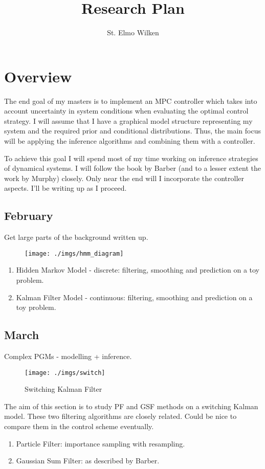 \documentclass[11pt,fleqn]{article}
\title{Research Plan}
\author{St. Elmo Wilken}
\begin{document}
\maketitle

\section{Overview}
The end goal of my masters is to implement an MPC controller which takes into account uncertainty in system conditions when evaluating the optimal control strategy. I will assume that I have a graphical model structure representing my system and the required prior and conditional distributions. Thus, the main focus will be applying the inference algorithms and combining them with a controller.

To achieve this goal I will spend most of my time working on inference strategies of dynamical systems. I will follow the book by Barber (and to a lesser extent the work by Murphy) closely. Only near the end will I incorporate the controller aspects. I'll be writing up as I proceed.

\subsection{February}
Get large parts of the background written up.
\begin{figure}[H] 
\centering
\texttt{[image: ./imgs/hmm\_diagram]}
\label{fig_hmm}
\end{figure}
\begin{enumerate}
\item
Hidden Markov Model - discrete: filtering, smoothing and prediction on a toy problem.
\item 
Kalman Filter Model - continuous: filtering, smoothing and prediction on a toy problem.
\end{enumerate}
\pagebreak

\subsection{March}
Complex PGMs - modelling + inference.
\begin{figure}[H] 
\centering
\texttt{[image: ./imgs/switch]}
\caption{Switching Kalman Filter}
\label{fig_switch}
\end{figure}
The aim of this section is to study PF and GSF methods on a switching Kalman model. These two filtering algorithms are closely related. Could be nice to compare them in the control scheme eventually.
\begin{enumerate}
\item
Particle Filter: importance sampling with resampling.
\item
Gaussian Sum Filter: as described by Barber.
\end{enumerate}
\pagebreak
\end{document}
